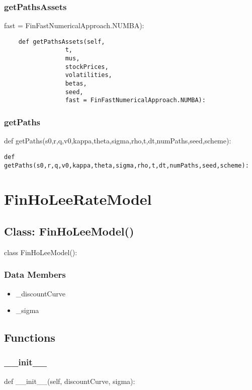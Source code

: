 \documentclass[twoside,11pt]{book}
\begin{document}
\subsubsection*{{\bf getPathsAssets}}
fast = FinFastNumericalApproach.NUMBA): 

\begin{lstlisting}
    def getPathsAssets(self, 
                 t,
                 mus,
                 stockPrices,
                 volatilities,
                 betas,
                 seed, 
                 fast = FinFastNumericalApproach.NUMBA):
\end{lstlisting}

\subsubsection*{{\bf getPaths}}
def getPaths(s0,r,q,v0,kappa,theta,sigma,rho,t,dt,numPaths,seed,scheme): 

\begin{lstlisting}
def getPaths(s0,r,q,v0,kappa,theta,sigma,rho,t,dt,numPaths,seed,scheme):
\end{lstlisting}

\newpage
\section{FinHoLeeRateModel}

\subsection*{Class: FinHoLeeModel()}
class FinHoLeeModel(): 

\subsubsection*{Data Members}
\begin{itemize}
\item{\_discountCurve}
\item{\_sigma}
\end{itemize}

\subsection*{Functions}

\subsubsection*{{\bf \_\_init\_\_}}
def \_\_init\_\_(self, discountCurve, sigma): 
\end{document}
